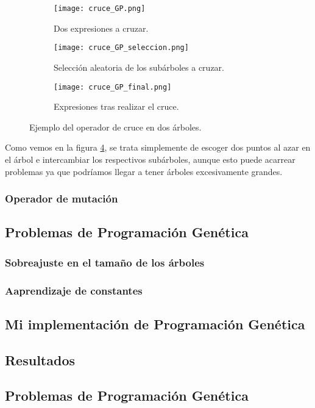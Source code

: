 \begin{figure}[H]
    \centering
	 \begin{subfigure}[b]{\textwidth}
		 \centering
		 \texttt{[image: cruce\_GP.png]}
		 \caption{Dos expresiones a cruzar.}
		 \label{fig:cruce_GP}
	 \end{subfigure}

	\begin{subfigure}[b]{\textwidth}
		 \centering
		\texttt{[image: cruce\_GP\_seleccion.png]}
		\caption{Selección aleatoria de los subárboles a cruzar.}
		\label{fig:cruce_GP_seleccion}
   \end{subfigure}

	\begin{subfigure}[b]{\textwidth}
		\centering
	  \texttt{[image: cruce\_GP\_final.png]}
	  \caption{Expresiones tras realizar el cruce.}
	  \label{fig:cruce_GP_final}
   \end{subfigure}

	\caption{Ejemplo del operador de cruce en dos árboles.}
	\label{fig:ej_cruce_GP}
\end{figure}

Como vemos en la figura \ref{fig:ej_cruce_GP}, se trata simplemente de escoger dos puntos al azar en el árbol e intercambiar los respectivos subárboles, aunque esto puede acarrear problemas ya que podríamos llegar a tener árboles excesivamente grandes.

\subsubsection{Operador de mutación}


\subsection{Problemas de Programación Genética}

\subsubsection{Sobreajuste en el tamaño de los árboles}

\subsubsection{Aaprendizaje de constantes}


\subsection{Mi implementación de Programación Genética}

\subsection{Resultados}

\subsection{Problemas de Programación Genética}
